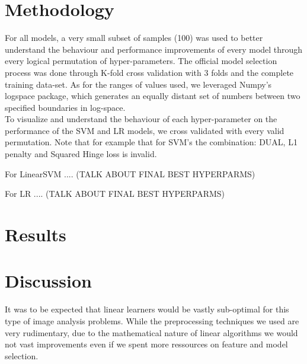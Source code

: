 \documentclass[10pt, hidelinks]{article}
\begin{document}
\section*{Methodology}

For all models, a very small subset of samples (100) was used to better understand the behaviour and performance improvements of every model through every logical permutation of hyper-parameters. The official model selection process was done through K-fold cross validation with 3 folds and the complete training data-set. As for the ranges of values used, we leveraged Numpy's logspace package, which generates an equally distant set of numbers between two specified boundaries in log-space.\\
\noindent To visualize and understand the behaviour of each hyper-parameter on the performance of the SVM and LR models, we cross validated with every valid permutation. Note that for example that for SVM's the combination: DUAL, L1 penalty and Squared Hinge loss is invalid.

\noindent For LinearSVM .... (TALK ABOUT FINAL BEST HYPERPARMS)

\noindent For LR .... (TALK ABOUT FINAL BEST HYPERPARMS)

\section*{Results}

\section*{Discussion}

It was to be expected that linear learners would be vastly sub-optimal for this type of image analysis problems. While the preprocessing techniques we used are very rudimentary, due to the mathematical nature of linear algorithms we would not vast improvements even if we spent more ressources on feature and model selection.
\end{document}

